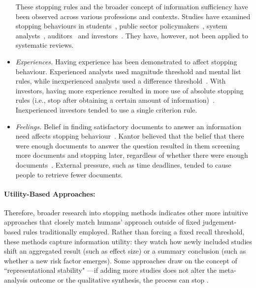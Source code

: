 \documentclass[10pt,oneside]{book}
\begin{document}
\begin{itemize}
    These stopping rules and the broader concept of information sufficiency have been observed across various professions and contexts. Studies have examined stopping behaviours in students~\cite{browne_stopping_2005, browne_cognitive_2007, dedema_examination_2019, nickles_judgment-based_1995, creighton_university_cognitive_2017, gerhart_generalizing_2020}, public sector policymakers~\cite{berryman_what_2006}, system analysts~\cite{pitts_stopping_2004}, auditors~\cite{poziemski_when_2019} and investors~\cite{pennington_how_2016}. They have, however, not been applied to systematic reviews.
 
    \item \emph{Experiences.} Having experience has been demonstrated to affect stopping behaviour. Experienced analysts used magnitude threshold and mental list rules, while inexperienced analysts used a difference threshold~\cite{pitts_stopping_2004}. With investors, having more experience resulted in more use of absolute stopping rules (i.e., stop after obtaining a certain amount of information)~\cite{pennington_how_2016}. Inexperienced investors tended to use a single criterion rule.

    \item \emph{Feelings.} Belief in finding satisfactory documents to answer an information need affects stopping behaviour~\cite{wu_online_2014}. Kantor believed that the belief that there were enough documents to answer the question resulted in them screening more documents and stopping later, regardless of whether there were enough documents~\cite{kantor_model_1987}. External pressure, such as time deadlines, tended to cause people to retrieve fewer documents.

\end{itemize}

\paragraph{Utility-Based Approaches: } 
Therefore, broader research into stopping methods indicates other more intuitive approaches that closely match humans' approach outside of fixed judgement-based rules traditionally employed. Rather than forcing a fixed recall threshold, these methods capture information utility: they watch how newly included studies shift an aggregated result (such as effect size) or a summary conclusion (such as whether a new risk factor emerges). Some approaches draw on the concept of ``representational stability" \cite{nickles_judgment-based_1995}—if adding more studies does not alter the meta-analysis outcome or the qualitative synthesis, the process can stop \cite{ilani_analysis_2024}.
\end{document}
